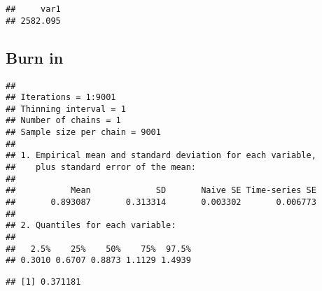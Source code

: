 \documentclass[
]{book}
\newenvironment{Shaded}{\begin{snugshade}}{\end{snugshade}}
\newcommand{\CommentTok}[1]{\textcolor[rgb]{0.56,0.35,0.01}{\textit{#1}}}
\newcommand{\DecValTok}[1]{\textcolor[rgb]{0.00,0.00,0.81}{#1}}
\newcommand{\FloatTok}[1]{\textcolor[rgb]{0.00,0.00,0.81}{#1}}
\newcommand{\KeywordTok}[1]{\textcolor[rgb]{0.13,0.29,0.53}{\textbf{#1}}}
\newcommand{\NormalTok}[1]{#1}
\newcommand{\OperatorTok}[1]{\textcolor[rgb]{0.81,0.36,0.00}{\textbf{#1}}}
\newcommand{\StringTok}[1]{\textcolor[rgb]{0.31,0.60,0.02}{#1}}
\begin{document}
\begin{verbatim}
##     var1 
## 2582.095
\end{verbatim}

\hypertarget{burn-in}{%
\subsection{Burn in}\label{burn-in}}

\begin{Shaded}
\end{Shaded}

\begin{verbatim}
## 
## Iterations = 1:9001
## Thinning interval = 1 
## Number of chains = 1 
## Sample size per chain = 9001 
## 
## 1. Empirical mean and standard deviation for each variable,
##    plus standard error of the mean:
## 
##           Mean             SD       Naive SE Time-series SE 
##       0.893087       0.313314       0.003302       0.006773 
## 
## 2. Quantiles for each variable:
## 
##   2.5%    25%    50%    75%  97.5% 
## 0.3010 0.6707 0.8873 1.1129 1.4939
\end{verbatim}

\begin{Shaded}
\end{Shaded}

\begin{verbatim}
## [1] 0.371181
\end{verbatim}

\backmatter
  
\end{document}

